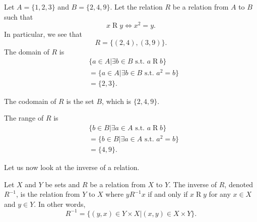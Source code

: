 \begin{example}
    Let $A = \{1,2,3\}$ and $B = \{2,4,9\}$. Let the relation $R$ be a relation from $A$ to $B$ such that
    \[
        x \mathrel{R} y \iff x^2 = y.
    \]
    In particular, we see that
    \[
        R = \{(2, 4), (3, 9)\}.
    \]
    The domain of $R$ is
    \begin{align*}
        &\{a \in A \vert \exists b \in B \text{ s.t. } a \mathrel{R} b\}\\
        &= \{a \in A \vert \exists b \in B \text{ s.t. } a^2 = b\}\\
        &= \{2, 3\}.
    \end{align*}

    The codomain of $R$ is the set $B$, which is $\{2,4,9\}$.

    The range of $R$ is
    \begin{align*}
        &\{b \in B \vert \exists a \in A \text{ s.t. } a \mathrel{R} b\}\\
        &= \{b \in B \vert \exists a \in A \text{ s.t. } a^2 = b\}\\
        &= \{4, 9\}.
    \end{align*}
\end{example}

Let us now look at the inverse of a relation.

\begin{definition}
    Let $X$ and $Y$ be sets and $R$ be a relation from $X$ to $Y$. The inverse of $R$, denoted $R^{-1}$, is the relation from $Y$ to $X$ where $y \mathrel{R^{-1}} x$ if and only if $x \mathrel{R} y$ for any $x \in X$ and $y \in Y$. In other words,
    \[
        R^{-1} = \{(y, x) \in Y \times X \vert (x, y) \in X \times Y\}.
    \]
\end{definition}

